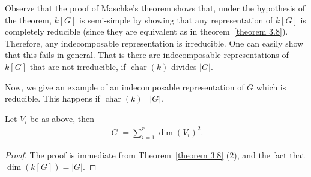 \begin{note}

    Observe that the proof of Maschke's theorem shows that, under the hypothesis of the theorem, $k[G]$ is semi-simple by
     showing that any representation of $k[G]$ is completely reducible (since they are equivalent as in theorem~\ref{theorem 3.8}). Therefore, any indecomposable representation is irreducible. One can easily show that this fails in general. 
     That is there are indecomposable representations of $k[G]$ that are not irreducible, if $\operatorname{char}(k)$ divides $|G|$.
\end{note}
Now, we give an example of an indecomposable representation of $G$ which is reducible. This happens if $\operatorname{char} (k) \mid |G|$.

\begin{corollary}
    Let $V_i$ be as above, then
    \begin{align*}
        |G| = \displaystyle \sum_{i=1}^r \dim(V_i)^2.
    \end{align*}
\end{corollary}
\begin{proof}
    The proof is immediate from Theorem~\ref{theorem 3.8} (2), and the fact that $\dim(k[G]) = |G|$.
\end{proof}

